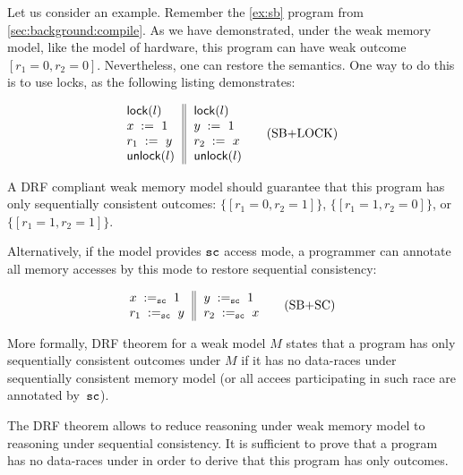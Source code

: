 Let us consider an example. 
Remember the \ref{ex:sb} program from \cref{sec:background:compile}.
As we have demonstrated, under the weak memory model,
like the model of \Intel hardware, 
this program can have weak outcome $[r_1=0, r_2=0]$.
Nevertheless, one can restore the \SC semantics.
One way to do this is to use locks, as the following listing demonstrates:

\begin{equation*}
\inarrII{
   \lockInst{l}         \\
   \writeInst{}{x}{1}   \\
   \readInst{}{r_1}{y}  \\
   \unlockInst{l}       \\
}{
   \lockInst{l}         \\
   \writeInst{}{y}{1}   \\
   \readInst{}{r_2}{x}  \\
   \unlockInst{l}       \\
}
\tag{SB+LOCK}\label{ex:sb-lock}
\end{equation*}

A DRF compliant weak memory model should guarantee 
that this program has only sequentially consistent outcomes:
$\{[r_1=0, r_2=1]\}$, $\{[r_1=1,r_2=0]\}$, or $\{[r_1=1,r_2=1]\}$.

Alternatively, if the model provides ${\mathtt{sc}}$ access mode, 
a programmer can annotate all memory accesses by this mode
to restore sequential consistency:  
 
\begin{equation*}
\inarrII{
   \writeInst{\sco}{x}{1}   \\
   \readInst{\sco}{r_1}{y}  \\
}{
   \writeInst{\sco}{y}{1}   \\
   \readInst{\sco}{r_2}{x}  \\
}
\tag{SB+SC}\label{ex:sb-sc}
\end{equation*}

More formally, DRF theorem for a weak model $M$ states that 
a program has only sequentially consistent outcomes under $M$
if it has no data-races under sequentially consistent memory model
(or all accees participating in such race are annotated by~${\mathtt{sc}}$).

The DRF theorem allows to reduce reasoning under weak memory model
to reasoning under sequential consistency.
It is sufficient to prove that a program has no data-races under \SC
in order to derive that this program has only \SC outcomes. 

